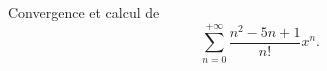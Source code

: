 \begin{enonce}
\begin{exercise}[ID={RMS123 E1010, CCP PSI},subtitle={},tags={}]
Convergence et calcul de
\begin{equation*}
  \sum_{n=0}^{+\infty} \frac{n^2-5n+1}{n!} x^n.
\end{equation*}
\end{exercise}
\begin{solution}
\end{solution}
\end{enonce}
